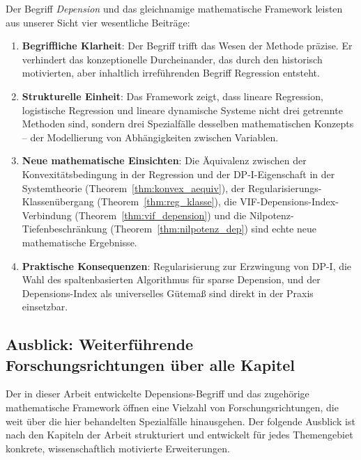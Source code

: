 ﻿\documentclass[12pt, a4paper]{article}
\theoremstyle{definition}
\theoremstyle{remark}
\begin{document}
Der Begriff \emph{Depension} und das gleichnamige mathematische Framework leisten
aus unserer Sicht vier wesentliche Beiträge:

\begin{enumerate}[label=(\arabic*)]
  \item \textbf{Begriffliche Klarheit}: Der Begriff trifft das Wesen der Methode
    präzise. Er verhindert das konzeptionelle Durcheinander, das durch den historisch
    motivierten, aber inhaltlich irreführenden Begriff Regression entsteht.

  \item \textbf{Strukturelle Einheit}: Das Framework zeigt, dass lineare Regression,
    logistische Regression und lineare dynamische Systeme nicht drei getrennte
    Methoden sind, sondern drei Spezialfälle desselben mathematischen Konzepts --
    der Modellierung von Abhängigkeiten zwischen Variablen.

  \item \textbf{Neue mathematische Einsichten}: Die Äquivalenz zwischen der
    Konvexitätsbedingung in der Regression und der DP-I-Eigenschaft in der
    Systemtheorie (Theorem~\ref{thm:konvex_aequiv}), der Regularisierungs-Klassenübergang
    (Theorem~\ref{thm:reg_klasse}), die VIF-Depensions-Index-Verbindung
    (Theorem~\ref{thm:vif_depension}) und die Nilpotenz-Tiefenbeschränkung
    (Theorem~\ref{thm:nilpotenz_dep}) sind echte neue mathematische Ergebnisse.

  \item \textbf{Praktische Konsequenzen}: Regularisierung zur Erzwingung von DP-I,
    die Wahl des spaltenbasierten Algorithmus für sparse Depension, und der
    Depensions-Index als universelles Gütemaß sind direkt in der Praxis einsetzbar.
\end{enumerate}

\subsection{Ausblick: Weiterführende Forschungsrichtungen über alle Kapitel}

Der in dieser Arbeit entwickelte Depensions-Begriff und das zugehörige mathematische
Framework öffnen eine Vielzahl von Forschungsrichtungen, die weit über die hier
behandelten Spezialfälle hinausgehen. Der folgende Ausblick ist nach den Kapiteln
der Arbeit strukturiert und entwickelt für jedes Themengebiet konkrete, wissenschaftlich
motivierte Erweiterungen.

\end{document}
